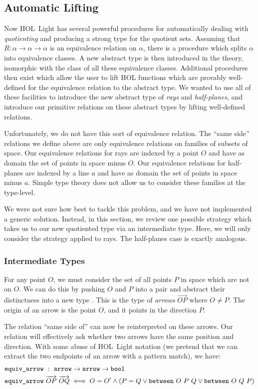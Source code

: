 \subsection{Automatic Lifting}
Now HOL~Light has several powerful procedures for automatically dealing with \emph{quotienting} and producing a strong type for the quotient sets. Assuming that $R:\alpha\rightarrow \alpha \rightarrow \alpha$ is an equivalence relation on $\alpha$, there is a procedure which splits $\alpha$ into equivalence classes. A new abstract type is then introduced in the theory, isomorphic with the class of all these equivalence classes. Additional procedures then exist which allow the user to lift HOL functions which are provably well-defined for the equivalence relation to the abstract type. We wanted to use all of these facilities to introduce the new abstract type of \emph{rays} and \emph{half-planes}, and introduce our primitive relations on these abstract types by lifting well-defined relations. 

Unfortunately, we do not have this sort of equivalence relation. The ``same side'' relations we define above are only equivalence relations on families of subsets of space. Our equivalence relations for rays are indexed by a point $O$ and have as domain the set of points in space minus $O$. Our equivalence relations for half-planes are indexed by a line $a$ and have as domain the set of points in space minus $a$. Simple type theory does not allow us to consider these families at the type-level.

We were not sure how best to tackle this problem, and we have not implemented a generic solution. Instead, in this section, we review one possible strategy which takes us to our new quotiented type via an intermediate type. Here, we will only consider the strategy applied to rays. The half-planes case is exactly analogous.

\subsubsection{Intermediate Types}
For any point $O$, we must consider the set of all points $P$ in space which are not on $O$. We can do this by pushing $O$ and $P$ into a pair and abstract their distinctness into a new type . This is the type of \emph{arrows} $\overrightarrow{OP}$ where $O \neq P$. The origin of an arrow is the point $O$, and it points in the direction $P$.

The relation ``same side of'' can now be reinterpreted on these arrows. Our relation will effectively ask whether two arrows have the same position and direction. With some abuse of HOL~Light notation (we pretend that we can extract the two endpoints of an arrow with a pattern match), we have:
\begin{equation}\label{eq:EquivArrowDef}
  \begin{split}
    &\code{equiv\_arrow}\ :\ \code{arrow} \rightarrow \code{arrow}\rightarrow \code{bool}\\
    &\code{equiv\_arrow}\ \overrightarrow{OP}\ \overrightarrow{OQ}\iff O = O' \wedge (P = Q \vee \between{O}{P}{Q} \vee \between{O}{Q}{P})
  \end{split}
\end{equation}

